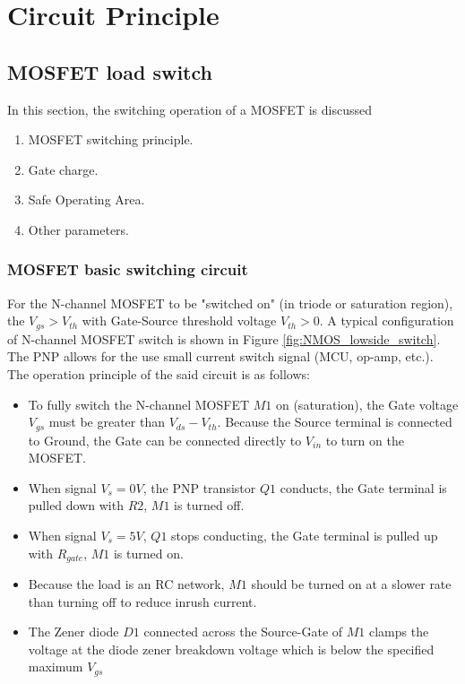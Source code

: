 \documentclass[main.tex]{subfiles}
\begin{document}
    \chapter{Circuit Principle}

    \section{MOSFET load switch}
    \justify
    In this section, the switching operation of a MOSFET is discussed
    \begin{enumerate}
        \item MOSFET switching principle.
        \item Gate charge.
        \item Safe Operating Area.
        \item Other parameters.
    \end{enumerate}

    \pagebreak
    \subsection{MOSFET basic switching circuit}

    \justify
    For the N-channel MOSFET to be  "switched on" (in triode or saturation region), the $V_{gs} > V_{th}$ with Gate-Source threshold voltage $V_{th} > 0$. A typical configuration of N-channel MOSFET switch is shown in Figure \ref{fig:NMOS_lowside_switch}. The PNP allows for the use small current switch signal (MCU, op-amp, etc.). The operation principle of the said circuit is as follows:

    \begin{itemize}
        \item To fully switch the N-channel MOSFET $M1$ on (saturation), the Gate voltage $V_{gs}$ must be greater than $V_{ds}-V_{th}$. Because the Source terminal is connected to Ground, the Gate can be connected directly to $V_{in}$ to turn on the MOSFET.
        \item When signal $V_s=0V$, the PNP transistor $Q1$ conducts, the Gate terminal is pulled down with $R2$, $M1$ is turned off. 
        \item When signal $V_s=5V$, $Q1$ stops conducting, the Gate terminal is pulled up with $R_{gate}$, $M1$ is turned on. 
        \item Because the load is an RC network, $M1$ should be turned on at a slower rate than turning off to reduce inrush current.
        \item The Zener diode $D1$ connected across the Source-Gate of $M1$ clamps the voltage at the diode zener breakdown voltage which is below the specified maximum $V_{gs}$

    \end{itemize}
\end{document}
